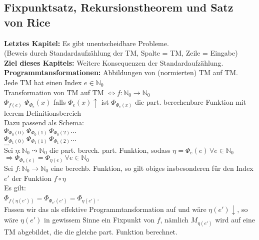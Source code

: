 
\subsection{Fixpunktsatz, Rekursionstheorem und Satz von Rice}
 
\textbf{Letztes Kapitel:} Es gibt unentscheidbare Probleme. \\
(Beweis durch Standardaufzählung der TM, Spalte = TM, Zeile = Eingabe) \\

\textbf{Ziel dieses Kapitels:} Weitere Konsequenzen der Standardaufzählung. \\

\textbf{Programmtansformationen:} Abbildungen von (normierten) TM auf TM. \\

Jede TM hat einen Index $e \in \mathbb{N}_0$ \\
Transformation von TM auf TM $\Leftrightarrow f: \mathbb{N}_0 \rightarrow \mathbb{N}_0$ \\
$\Phi_{f(e)}$
$\Phi_{\Phi_{e}}(x)$ falls $\Phi_e(x)\uparrow$ ist $\Phi_{\Phi_e(x)}$ die 
part. berechenbare Funktion mit leerem Definitionsbereich \\

Dazu passend als Schema: \\
$\Phi_{\Phi_0(0)} \, \Phi_{\Phi_0(1)} \, \Phi_{\Phi_0(2)}...$ \\
$\Phi_{\Phi_1(0)} \, \Phi_{\Phi_1(1)} \, \Phi_{\Phi_1(2)}...$ \\
$...$ \\

Sei $\eta : \mathbb{N}_0 \leadsto \mathbb{N}_0$ die part. berech. part. Funktion, sodass 
$\eta = \Phi_e(e) \, \forall e \in \mathbb{N}_0$ \\
$\Rightarrow \Phi_{\Phi_e(e)} = \Phi_{\eta(e)} \, \forall e \in \mathbb{N}_0$ \\

Sei $f: \mathbb{N}_0 \rightarrow \mathbb{N}_0$ eine berechb. Funktion, so gilt obiges insbesonderen für den Index $e'$
der Funktion $f \circ \eta$ \\

Es gilt: \\
$\Phi_{f(\eta(e'))} = \Phi_{\Phi_{e'}(e')} = \Phi_{\eta(e')}$. \\

Fassen wir das als effektive Programmtansformation auf und wäre $\eta(e')\downarrow$, so wäre $\eta(e')$ in
gewissem Sinne ein Fixpunkt von $f$, nämlich $M_{\eta(e')}$ wird auf eine TM abgebildet, die die gleiche part. Funktion berechnet.

